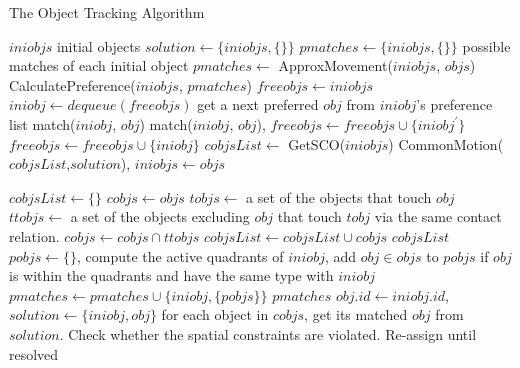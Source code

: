 \documentclass[letterpaper]{article}
\begin{document}
\begin{algorithm}[!]
\caption{The Object Tracking Algorithm}\label{algo}
\begin{algorithmic}[1]
\State $iniobjs$ \Comment initial objects
\State $solution \leftarrow \{iniobjs, \{\}\}$
\State $pmatches \leftarrow \{iniobjs, \{\}\}$ \Comment possible matches of each initial object
\State $pmatches \leftarrow$ ApproxMovement($iniobjs$, $objs$) \label{SetPossible}
\State CalculatePreference($iniobjs$, $pmatches$)\label{calPref}
\State $freeobjs \leftarrow iniobjs$
\label{stableMarriage}
\State $iniobj \leftarrow dequeue(freeobjs)$
\State get a next preferred $obj$ from $iniobj$'s preference list  
  \State match($iniobj$, $obj$)
  \State match($iniobj$, $obj$), $freeobjs \leftarrow freeobjs \cup \{iniobj^{\prime}\}$
  \Else 
  \State $freeobjs \leftarrow freeobjs \cup \{iniobj\}$
\EndIf 
\EndIf
\EndWhile
\State $cobjsList \leftarrow$ GetSCO($iniobjs$)
\State CommonMotion($cobjsList$,$solution$), $iniobjs \leftarrow objs$
\EndProcedure

\label{getSCO}
\State $cobjsList \leftarrow \{\}$
\State $cobjs \leftarrow objs$ 
\State $tobjs \leftarrow$ a set of the objects that touch $obj$
\State $ttobjs \leftarrow$ a set of the objects excluding $obj$ that touch $tobj$ via the same contact relation.
\State $cobjs \leftarrow cobjs \cap ttobjs$
\EndFor
\State $cobjsList \leftarrow cobjsList \cup cobjs$
\EndFor
\Return $cobjsList$
\EndProcedure
{}\label{MA}
\State $pobjs \leftarrow \{\}$, compute the active quadrants of $iniobj$, add $obj \in objs$ to $pobjs$ if $obj$ is within the quadrants and have the same type with $iniobj$ 
\State $pmatches \leftarrow pmatches \cup \{iniobj, \{pobjs\}\}$
\EndFor
\Return $pmatches$
\EndProcedure
{}
\State $obj.id \leftarrow iniobj.id$, $solution \leftarrow \{iniobj, obj\}$
\EndProcedure
{}\label{CommonMotion}
\State for each object in $cobjs$, get its matched $obj$ from $solution$. Check whether the spatial constraints are violated. Re-assign until resolved  
\EndFor
\EndProcedure
\end{algorithmic}
\end{algorithm}
\newpage



 
\end{document}
